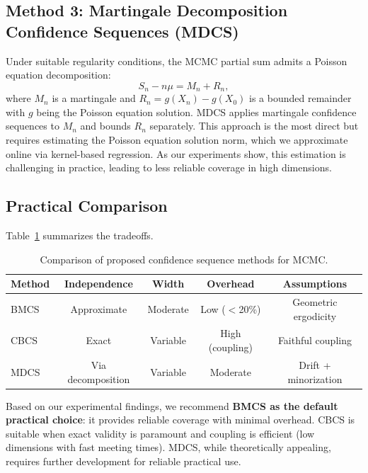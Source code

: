 \documentclass[11pt]{article}
\begin{document}
\subsection{Method 3: Martingale Decomposition Confidence Sequences (MDCS)}

Under suitable regularity conditions, the MCMC partial sum admits a Poisson equation decomposition:
\begin{equation}
S_n - n\mu = M_n + R_n,
\label{eq:poisson}
\end{equation}
where $M_n$ is a martingale and $R_n = g(X_n) - g(X_0)$ is a bounded remainder with $g$ being the Poisson equation solution. MDCS applies martingale confidence sequences to $M_n$ and bounds $R_n$ separately. This approach is the most direct but requires estimating the Poisson equation solution norm, which we approximate online via kernel-based regression. As our experiments show, this estimation is challenging in practice, leading to less reliable coverage in high dimensions.

\subsection{Practical Comparison}

Table~\ref{tab:method_comparison} summarizes the tradeoffs.

\begin{table}[t]
\caption{Comparison of proposed confidence sequence methods for MCMC.}
\label{tab:method_comparison}
\centering
\begin{tabular}{lcccc}
\toprule
Method & Independence & Width & Overhead & Assumptions \\
\midrule
BMCS & Approximate & Moderate & Low ($<$20\%) & Geometric ergodicity \\
CBCS & Exact & Variable & High (coupling) & Faithful coupling \\
MDCS & Via decomposition & Variable & Moderate & Drift + minorization \\
\bottomrule
\end{tabular}
\end{table}

Based on our experimental findings, we recommend \textbf{BMCS as the default practical choice}: it provides reliable coverage with minimal overhead. CBCS is suitable when exact validity is paramount and coupling is efficient (low dimensions with fast meeting times). MDCS, while theoretically appealing, requires further development for reliable practical use.
\end{document}
